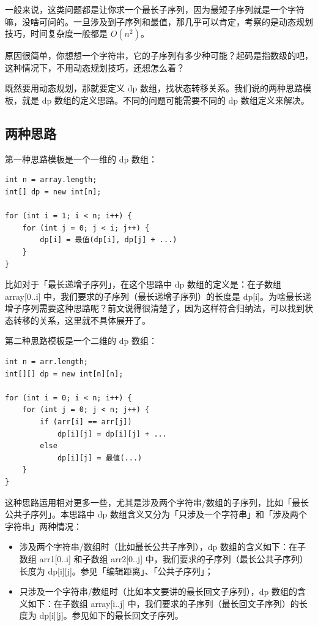 \documentclass[12pt]{article}
\begin{document}
一般来说，这类问题都是让你求一个最长子序列，因为最短子序列就是一个字符嘛，没啥可问的。一旦涉及到子序列和最值，那几乎可以肯定，考察的是动态规划技巧，时间复杂度一般都是 $O(n^2)$。

原因很简单，你想想一个字符串，它的子序列有多少种可能？起码是指数级的吧，这种情况下，不用动态规划技巧，还想怎么着？

既然要用动态规划，那就要定义 dp 数组，找状态转移关系。我们说的两种思路模板，就是 dp 数组的定义思路。不同的问题可能需要不同的 dp 数组定义来解决。

\subsection{两种思路}
第一种思路模板是一个一维的 dp 数组：
\begin{lstlisting}
int n = array.length;
int[] dp = new int[n];

for (int i = 1; i < n; i++) {
    for (int j = 0; j < i; j++) {
        dp[i] = 最值(dp[i], dp[j] + ...)
    }
}
\end{lstlisting}

比如对于「最长递增子序列」，在这个思路中 dp 数组的定义是：在子数组 array[0..i] 中，我们要求的子序列（最长递增子序列）的长度是 dp[i]。为啥最长递增子序列需要这种思路呢？前文说得很清楚了，因为这样符合归纳法，可以找到状态转移的关系，这里就不具体展开了。

第二种思路模板是一个二维的 dp 数组：
\begin{lstlisting}
int n = arr.length;
int[][] dp = new int[n][n];

for (int i = 0; i < n; i++) {
    for (int j = 0; j < n; j++) {
        if (arr[i] == arr[j]) 
            dp[i][j] = dp[i][j] + ...
        else
            dp[i][j] = 最值(...)
    }
}
\end{lstlisting}
这种思路运用相对更多一些，尤其是涉及两个字符串/数组的子序列，比如「最长公共子序列」。本思路中 dp 数组含义又分为「只涉及一个字符串」和「涉及两个字符串」两种情况：
\begin{itemize}
\setlength{\itemsep}{0pt}
\setlength{\parsep}{0pt}
\setlength{\parskip}{0pt}
    \item 涉及两个字符串/数组时（比如最长公共子序列），dp 数组的含义如下：在子数组 arr1[0..i] 和子数组 arr2[0..j] 中，我们要求的子序列（最长公共子序列）长度为 dp[i][j]。参见「编辑距离」、「公共子序列」；
    \item 只涉及一个字符串/数组时（比如本文要讲的最长回文子序列），dp 数组的含义如下：在子数组 array[i..j] 中，我们要求的子序列（最长回文子序列）的长度为 dp[i][j]。参见如下的最长回文子序列。
\end{itemize}
\end{document}
